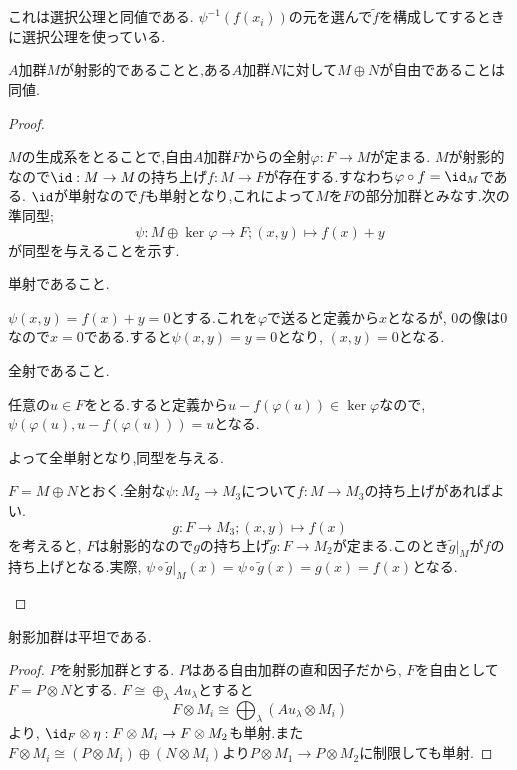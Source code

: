 これは選択公理と同値である. $\psi^{-1}(f(x_i))$の元を選んで$\widetilde{f}$を構成してするときに選択公理を使っている.
\begin{thm}
	$A$加群$M$が射影的であることと,ある$A$加群$N$に対して$M\oplus N$が自由であることは同値.
\end{thm}
\begin{proof}
	\begin{eqv}
		\item 
		$M$の生成系をとることで,自由$A$加群$F$からの全射$\varphi:F\to M$が定まる. $M$が射影的なので$\id:M\to M$の持ち上げ$f:M\to F$が存在する.すなわち$\varphi\circ f=\id_M$である. $\id$が単射なので$f$も単射となり,これによって$M$を$F$の部分加群とみなす.次の準同型;
		\[\psi:M\oplus \ker\varphi\to F;(x,y)\mapsto f(x)+y\]
		が同型を与えることを示す.
		
		\begin{mrkw}
			\item 単射であること.
			
			$\psi(x,y)=f(x)+y=0$とする.これを$\varphi$で送ると定義から$x$となるが, 0の像は0なので$x=0$である.すると$\psi(x,y)=y=0$となり, $(x,y)=0$となる.
			\item 全射であること.
			
			任意の$u\in F$をとる.すると定義から$u-f(\varphi(u))\in\ker\varphi$なので, $\psi(\varphi(u),u-f(\varphi(u)))=u$となる.
		\end{mrkw}
		よって全単射となり,同型を与える.
		\item 
		$F=M\oplus N$とおく.全射な$\psi:M_2\to M_3$について$f:M\to M_3$の持ち上げがあればよい.
		\[g:F\to M_3;(x,y)\mapsto f(x)\]
		を考えると, $F$は射影的なので$g$の持ち上げ$\widetilde{g}:F\to M_2$が定まる.このとき$\widetilde{g}|_M$が$f$の持ち上げとなる.実際, $\psi\circ\widetilde{g}|_M(x)=\psi\circ\widetilde{g}(x)=g(x)=f(x)$となる.
	\end{eqv}
\end{proof}

\begin{thm}
	射影加群は平坦である.
\end{thm}
\begin{proof}
	$P$を射影加群とする. $P$はある自由加群の直和因子だから, $F$を自由として$F=P\otimes N$とする. $F\cong\oplus_\lambda Au_\lambda$とすると
	\[F\otimes M_i\cong \bigoplus_\lambda (Au_\lambda\otimes M_i)\]
	より, $\id_{F}\otimes\eta:F\otimes M_i\to F\otimes M_2$も単射.また$F\otimes M_i\cong (P\otimes M_i)\oplus (N\otimes M_i)$より$P\otimes M_1\to P\otimes M_2$に制限しても単射.
\end{proof}

